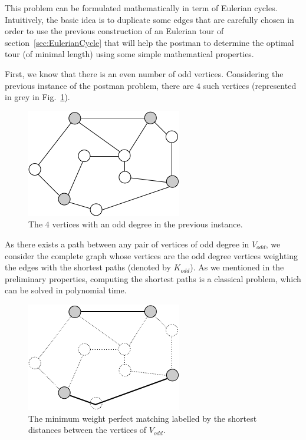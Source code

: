 This problem can be formulated mathematically in term of Eulerian
cycles.  Intuitively, the basic idea is to duplicate some edges that
are carefully chosen in order to use the previous construction of an
Eulerian tour of section~\ref{sec:EulerianCycle} that will help the
postman to determine the optimal tour (of minimal length) using some
simple mathematical properties.
\bigskip

First, we know that there is an even number of odd vertices.
Considering the previous instance of the postman problem, there are $4$ such vertices (represented in grey in Fig.~\ref{fig:EulerianVodd}).

\begin{figure}[hbt]
\begin{center}
       \includegraphics[scale=0.6]{FiguresGraph/EulerienVodd}
       \caption{The $4$ vertices with an odd degree in the previous instance.}
              \label{fig:EulerianVodd}
\end{center}
\end{figure}
\bigskip

As there exists a path between any pair of vertices of odd degree in $V_{odd}$,
we consider the complete graph whose vertices are the odd degree vertices weighting the edges with the shortest paths (denoted by $K_{odd}$).
As we mentioned in the preliminary properties, computing the shortest paths is a classical problem, which can be solved in polynomial time. 

\begin{figure}[hbt]
\begin{center}
       \includegraphics[scale=0.6]{FiguresGraph/EulerienPerfectMatching}
       \caption{The minimum weight perfect matching labelled by the shortest distances between the vertices of $V_{odd}$.}
              \label{fig:Eulerianperfectmatching}
\end{center}
\end{figure}
\bigskip

